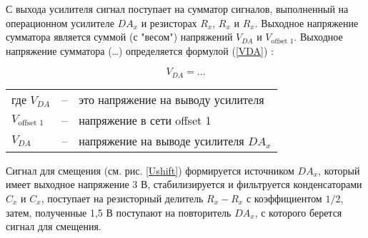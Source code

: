 С выхода усилителя сигнал поступает на сумматор сигналов, выполненный на операционном усилителе $DA_x$ 
и резисторах $R_x$, $R_x$ и $R_x$. Выходное напряжение сумматора является суммой (с "весом") напряжений $V_{DA}$ и 
$V_\text{offset 1}$. 
Выходное напряжение сумматора (\ldots) определяется формулой (\ref{VDA}) :

\begin{equation}
V_{DA} = \ldots
\label{VDA}
\end{equation}


\begin{tabular}{lll}
	где $V_{DA}$ &--& это напряжение на выводу усилителя\\
	$V_\text{offset 1}$ &--& напряжение в сети offset 1\\
	$V_{DA}$ & -- & напряжение на выводе усилителя $DA_x$
\end{tabular}

Сигнал для смещения (см. рис. \ref{Ushift}) формируется источником {$DA_x$}, который имеет выходное напряжение 3 В, 
стабилизируется и фильтруется конденсаторами $C_x$ и $C_x$, поступает на резисторный делитель $R_x-R_x$ с коэффициентом 
$1/2$, 
затем, полученные 1,5 В поступают на повторитель $DA_x$, с которого берется сигнал для смещения.


